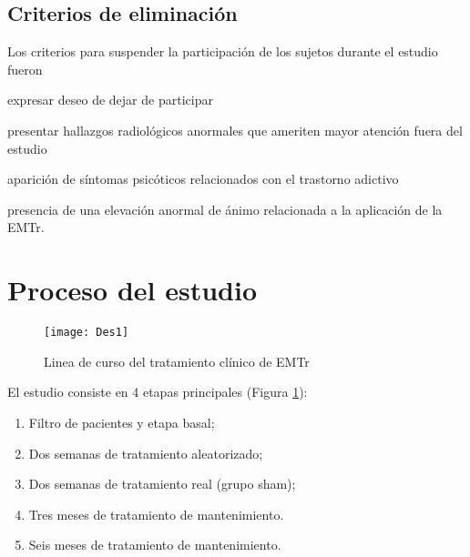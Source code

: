 \subsection{Criterios de eliminación}
Los criterios para suspender la participación de los sujetos durante el estudio fueron
\begin{enumerate*}[label=\emph{\alph*}), before=\unskip{: }, itemjoin={{; }}, itemjoin*={{, y }}]
    \item expresar deseo de dejar de participar
    \item presentar hallazgos radiológicos anormales que ameriten mayor atención fuera del estudio
    \item aparición de síntomas psicóticos relacionados con el trastorno adictivo
    \item presencia de una elevación anormal de ánimo relacionada a la aplicación de la EMTr.
\end{enumerate*}

\section{Proceso del estudio}
\begin{figure}[h]
    \centering
    \texttt{[image: Des1]}
    \caption{Linea de curso del tratamiento clínico de EMTr}
    \label{fig:txTMS}
\end{figure}

El estudio consiste en 4 etapas principales (Figura \ref{fig:txTMS}):
\begin{enumerate}[start=0,leftmargin=3\parindent,align=left,label=Etapa \arabic*:]
    \item Filtro de pacientes y etapa basal;
    \item Dos semanas de tratamiento aleatorizado;
    \item[Etapa 1-4:] Dos semanas de tratamiento real (grupo sham);
    \item Tres meses de tratamiento de mantenimiento.
    \item Seis meses de tratamiento de mantenimiento.
\end{enumerate}

